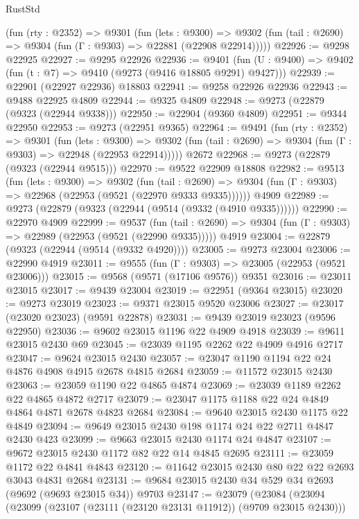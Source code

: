 \begin{lexlean}{RustStd}
\begin{coremodule}
{\begin{coremodule}
{{{{{{{{{{{{{{{{{{{{{{{{{{{{{{{{{{{{{{{{{{{{{{{{{{{{{{{    (fun (rty : @2352) =>
    @9301
      (fun (lets : @9300) =>
      @9302 (fun (tail : @2690) => @9304 (fun (Γ : @9303) => @22881 (@22908 @22914)))))
@22926 := @9298 @22925
@22927 := @9295 @22926
@22936 := @9401
    (fun (U : @9400) => @9402 (fun (t : @7) => @9410 (@9273 (@9416 @18805 @9291) @9427)))
@22939 := @22901 (@22927 @22936) @18803
@22941 := @9258 @22926 @22936
@22943 := @9488 @22925 @4809
@22944 := @9325 @4809
@22948 := @9273 (@22879 (@9323 (@22944 @9338)))
@22950 := @22904 (@9360 @4809)
@22951 := @9344 @22950
@22953 := @9273 (@22951 @9365)
@22964 := @9491
    (fun (rty : @2352) =>
    @9301
      (fun (lets : @9300) =>
      @9302 (fun (tail : @2690) => @9304 (fun (Γ : @9303) => @22948 (@22953 @22914)))))
    @2672
@22968 := @9273 (@22879 (@9323 (@22944 @9515)))
@22970 := @9522 @22909 @18808
@22982 := @9513
    (fun (lets : @9300) =>
    @9302
      (fun (tail : @2690) =>
      @9304 (fun (Γ : @9303) => @22968 (@22953 (@9521 (@22970 @9333 @9335))))))
    @4909
@22989 := @9273 (@22879 (@9323 (@22944 (@9514 (@9332 (@4910 @9335))))))
@22990 := @22970 @4909
@22999 := @9537
    (fun (tail : @2690) => @9304 (fun (Γ : @9303) => @22989 (@22953 (@9521 (@22990 @9335)))))
    @4919
@23004 := @22879 (@9323 (@22944 (@9514 (@9332 @4920))))
@23005 := @9273 @23004
@23006 := @22990 @4919
@23011 := @9555 (fun (Γ : @9303) => @23005 (@22953 (@9521 @23006)))
@23015 := @9568 (@9571 (@17106 @9576)) @9351
@23016 := @23011 @23015
@23017 := @9439 @23004
@23019 := @22951 (@9364 @23015)
@23020 := @9273 @23019
@23023 := @9371 @23015 @9520 @23006
@23027 := @23017 (@23020 @23023) (@9591 @22878)
@23031 := @9439 @23019 @23023 (@9596 @22950)
@23036 := @9602 @23015 @1196 @22 @4909 @4918
@23039 := @9611 @23015 @2430 @69
@23045 := @23039 @1195 @2262 @22 @4909 @4916 @2717
@23047 := @9624 @23015 @2430
@23057 := @23047 @1190 @1194 @22 @24 @4876 @4908 @4915 @2678 @4815 @2684
@23059 := @11572 @23015 @2430
@23063 := @23059 @1190 @22 @4865 @4874
@23069 := @23039 @1189 @2262 @22 @4865 @4872 @2717
@23079 := @23047 @1175 @1188 @22 @24 @4849 @4864 @4871 @2678 @4823 @2684
@23084 := @9640 @23015 @2430 @1175 @22 @4849
@23094 := @9649 @23015 @2430 @198 @1174 @24 @22 @2711 @4847 @2430 @423
@23099 := @9663 @23015 @2430 @1174 @24 @4847
@23107 := @9672 @23015 @2430 @1172 @82 @22 @14 @4845 @2695
@23111 := @23059 @1172 @22 @4841 @4843
@23120 := @11642 @23015 @2430 @80 @22 @22 @2693 @3043 @4831 @2684
@23131 := @9684 @23015 @2430 @34 @529 @34 @2693 (@9692 (@9693 @23015 @34)) @9703
@23147 := @23079
    (@23084
      (@23094
        (@23099 (@23107 (@23111 (@23120 @23131 @11912)) (@9709 @23015 @2430)))
}}}}}}}}}}}}}}}}}}}}}}}}}}}}}}}}}}}}}}}}}}}}}}}}}}}}}}}
\end{coremodule}}
\end{coremodule}
\end{lexlean}
